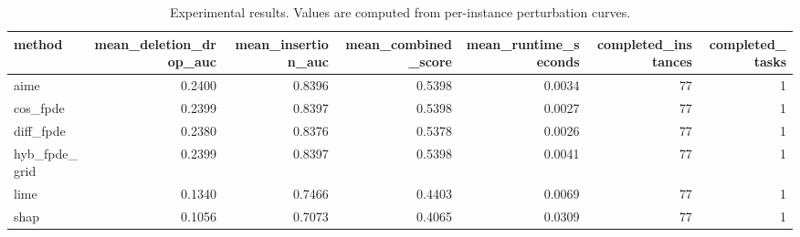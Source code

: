 \begin{table}[t]
\caption{Experimental results. Values are computed from per-instance perturbation curves.}
\label{tab:main_results_computed}
\centering
\begin{tabular}{lrrrrrr}
\toprule
method & mean\_deletion\_drop\_auc & mean\_insertion\_auc & mean\_combined\_score & mean\_runtime\_seconds & completed\_instances & completed\_tasks \\
\midrule
aime & 0.2400 & 0.8396 & 0.5398 & 0.0034 & 77 & 1 \\
cos\_fpde & 0.2399 & 0.8397 & 0.5398 & 0.0027 & 77 & 1 \\
diff\_fpde & 0.2380 & 0.8376 & 0.5378 & 0.0026 & 77 & 1 \\
hyb\_fpde\_grid & 0.2399 & 0.8397 & 0.5398 & 0.0041 & 77 & 1 \\
lime & 0.1340 & 0.7466 & 0.4403 & 0.0069 & 77 & 1 \\
shap & 0.1056 & 0.7073 & 0.4065 & 0.0309 & 77 & 1 \\
\bottomrule
\end{tabular}

\end{table}
